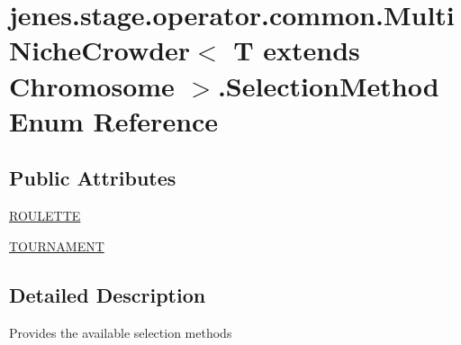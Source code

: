\hypertarget{enumjenes_1_1stage_1_1operator_1_1common_1_1_multi_niche_crowder_3_01_t_01extends_01_chromosome_01_4_1_1_selection_method}{\section{jenes.\-stage.\-operator.\-common.\-Multi\-Niche\-Crowder$<$ T extends Chromosome $>$.Selection\-Method Enum Reference}
\label{enumjenes_1_1stage_1_1operator_1_1common_1_1_multi_niche_crowder_3_01_t_01extends_01_chromosome_01_4_1_1_selection_method}
}
\subsection*{Public Attributes}
\begin{DoxyCompactItemize}
\item 
\hyperlink{enumjenes_1_1stage_1_1operator_1_1common_1_1_multi_niche_crowder_3_01_t_01extends_01_chromosome_01_4_1_1_selection_method_a44f558dff5b15ba99535399a634e0433}{R\-O\-U\-L\-E\-T\-T\-E}
\item 
\hyperlink{enumjenes_1_1stage_1_1operator_1_1common_1_1_multi_niche_crowder_3_01_t_01extends_01_chromosome_01_4_1_1_selection_method_a3e49b3accf5c2ac32eabdf0b69951280}{T\-O\-U\-R\-N\-A\-M\-E\-N\-T}
\end{DoxyCompactItemize}


\subsection{Detailed Description}
Provides the available selection methods 

